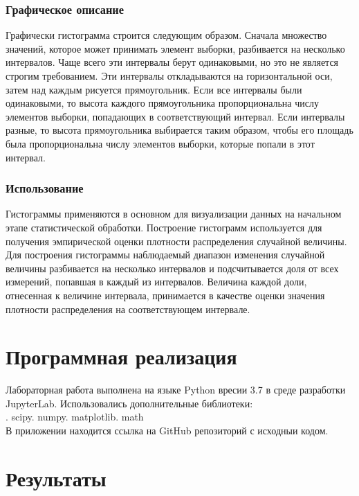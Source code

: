 \documentclass[a4paper]{article}
\begin{document}
	\subsubsection{Графическое описание}
	\noindent Графически гистограмма строится следующим образом. Сначала множество значений, которое может принимать элемент выборки, разбивается на несколько интервалов. Чаще всего эти интервалы берут одинаковыми, но это не является строгим требованием. Эти интервалы откладываются на горизонтальной оси, затем над каждым рисуется прямоугольник. Если все интервалы были одинаковыми, то высота каждого прямоугольника пропорциональна числу элементов выборки, попадающих в соответствующий интервал. Если интервалы разные, то высота прямоугольника выбирается таким образом, чтобы его площадь была пропорциональна числу элементов выборки, которые попали в этот интервал.
	
	\subsubsection{Использование}
	\noindent Гистограммы применяются в основном для визуализации данных на начальном этапе статистической обработки. \newline Построение гистограмм используется для получения эмпирической оценки плотности распределения случайной величины. Для построения гистограммы наблюдаемый диапазон изменения случайной величины разбивается на несколько интервалов и подсчитывается доля от всех измерений, попавшая в каждый из интервалов. Величина каждой доли, отнесенная к величине интервала, принимается в качестве оценки значения плотности распределения на соответствующем интервале.

\section {Программная реализация} 	
\noindent Лабораторная работа выполнена на языке Python вресии 3.7 в среде разработки JupyterLab. Использовались дополнительные библиотеки:\\ . scipy. numpy. matplotlib. math\newline \\
В приложении находится ссылка на GitHub репозиторий с исходныи кодом.

\section {Результаты} 
\end{document}
